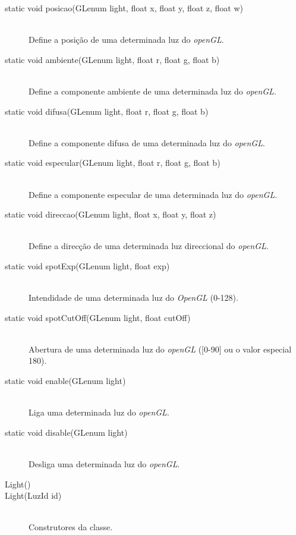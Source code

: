 \documentclass[a5paper,onecolumn, 11pt]{article}
\begin{document}
\begin{description}
	\item[static void posicao(GLenum light, float x, float y, float z, float w)] \hfill \\
	Define a posição de uma determinada luz do \textit{openGL}.

	\item[static void ambiente(GLenum light, float r, float g, float b)] \hfill \\
	Define a componente ambiente de uma determinada luz do \textit{openGL}.

	\item[static void difusa(GLenum light, float r, float g, float b)] \hfill \\
	Define a componente difusa de uma determinada luz do \textit{openGL}.

	\item[static void especular(GLenum light, float r, float g, float b)] \hfill \\
	Define a componente especular de uma determinada luz do \textit{openGL}.

	\item[static void direccao(GLenum light, float x, float y, float z)] \hfill \\
	Define a direcção de uma determinada luz direccional do \textit{openGL}.

	\item[static void spotExp(GLenum light, float exp)] \hfill \\
	Intendidade de uma determinada luz do \textit{OpenGL} (0-128).

	\item[static void spotCutOff(GLenum light, float cutOff)] \hfill \\
	Abertura de uma determinada luz do \textit{openGL} ([0-90] ou o valor especial 180).

	\item[static void enable(GLenum light)] \hfill \\
	Liga uma determinada luz do \textit{openGL}.

	\item[static void disable(GLenum light)] \hfill \\
	Desliga uma determinada luz do \textit{openGL}.

	\item[Light()]
	\item[Light(LuzId id)] \hfill \\
	Construtores da classe.
	

\end{description}
\end{document}
